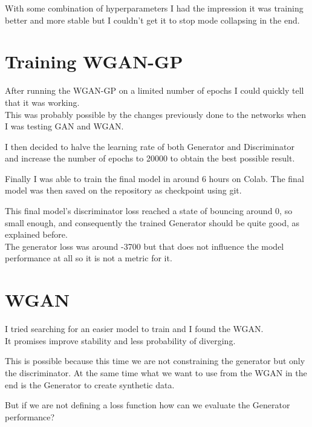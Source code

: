 \documentclass[
  letterpaper,
  DIV=11,
  numbers=noendperiod]{scrreprt}
\begin{document}
With some combination of hyperparameters I had the impression it was
training better and more stable but I couldn't get it to stop mode
collapsing in the end.

\hypertarget{training-wgan-gp}{%
\chapter{Training WGAN-GP}\label{training-wgan-gp}}

After running the WGAN-GP on a limited number of epochs I could quickly
tell that it was working.\\
This was probably possible by the changes previously done to the
networks when I was testing GAN and WGAN.

I then decided to halve the learning rate of both Generator and
Discriminator and increase the number of epochs to 20000 to obtain the
best possible result.

Finally I was able to train the final model in around 6 hours on Colab.
The final model was then saved on the repository as checkpoint using
git.

This final model's discriminator loss reached a state of bouncing around
0, so small enough, and consequently the trained Generator should be
quite good, as explained before.\\
The generator loss was around -3700 but that does not influence the
model performance at all so it is not a metric for it.

\hypertarget{wgan}{%
\chapter{WGAN}\label{wgan}}

I tried searching for an easier model to train and I found the WGAN.\\
It promises improve stability and less probability of diverging.

This is possible because this time we are not constraining the generator
but only the discriminator. At the same time what we want to use from
the WGAN in the end is the Generator to create synthetic data.

But if we are not defining a loss function how can we evaluate the
Generator performance?
\end{document}
